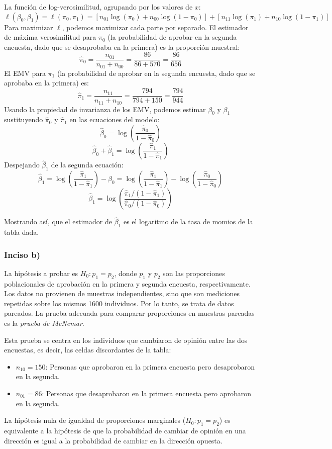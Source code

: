 \documentclass[paper=letter, fontsize=11pt, draft=false]{scrartcl}\usepackage[]{graphicx}\usepackage[]{xcolor}
\numberwithin{equation}{problemcounter} %
\numberwithin{figure}{problemcounter} %
\numberwithin{table}{problemcounter} %
\numberwithin{subsection}{problemcounter}
\begin{document}
La función de log-verosimilitud, agrupando por los valores de $x$:
\[
\ell(\beta_0, \beta_1) = \ell(\pi_0, \pi_1) = [n_{01}\log(\pi_0) + n_{00}\log(1-\pi_0)] + [n_{11}\log(\pi_1) + n_{10}\log(1-\pi_1)]
\]
Para maximizar $\ell$, podemos maximizar cada parte por separado.
El estimador de máxima verosimilitud para $\pi_0$ (la probabilidad de aprobar en la segunda encuesta, dado que se desaprobaba en la primera) es la proporción muestral:
\[
\hat{\pi}_0 = \frac{n_{01}}{n_{01}+n_{00}} = \frac{86}{86+570} = \frac{86}{656}
\]
El EMV para $\pi_1$ (la probabilidad de aprobar en la segunda encuesta, dado que se aprobaba en la primera) es:
\[
\hat{\pi}_1 = \frac{n_{11}}{n_{11}+n_{10}} = \frac{794}{794+150} = \frac{794}{944}
\]
Usando la propiedad de invarianza de los EMV, podemos estimar $\beta_0$ y $\beta_1$ sustituyendo $\hat{\pi}_0$ y $\hat{\pi}_1$ en las ecuaciones del modelo:
\[
\hat{\beta}_0 = \log\left(\frac{\hat{\pi}_0}{1-\hat{\pi}_0}\right)
\]
\[
\hat{\beta}_0 + \hat{\beta}_1 = \log\left(\frac{\hat{\pi}_1}{1-\hat{\pi}_1}\right)
\]
Despejando $\hat{\beta}_1$ de la segunda ecuación:
\[
\hat{\beta}_1 = \log\left(\frac{\hat{\pi}_1}{1-\hat{\pi}_1}\right) - \hat{\beta}_0 = \log\left(\frac{\hat{\pi}_1}{1-\hat{\pi}_1}\right) - \log\left(\frac{\hat{\pi}_0}{1-\hat{\pi}_0}\right)
\]
\[
\hat{\beta}_1 = \log\left( \frac{\hat{\pi}_1/(1-\hat{\pi}_1)}{\hat{\pi}_0/(1-\hat{\pi}_0)} \right)
\]

Mostrando así, que el estimador de $\hat{\beta}_1$ es el logaritmo de la tasa de momios de la tabla dada.

\subsubsection*{Inciso b)}

La hipótesis a probar es $H_0: p_1 = p_2$, donde $p_1$ y $p_2$ son las proporciones poblacionales de aprobación en la primera y segunda encuesta, respectivamente.
Los datos no provienen de muestras independientes, sino que son mediciones repetidas sobre los mismos 1600 individuos. Por lo tanto, se trata de datos pareados. La prueba adecuada para comparar proporciones en muestras pareadas es la \textit{prueba de McNemar}.

Esta prueba se centra en los individuos que cambiaron de opinión entre las dos encuestas, es decir, las celdas discordantes de la tabla:
\begin{itemize}
    \item $n_{10} = 150$: Personas que aprobaron en la primera encuesta pero desaprobaron en la segunda.
    \item $n_{01} = 86$: Personas que desaprobaron en la primera encuesta pero aprobaron en la segunda.
\end{itemize}
La hipótesis nula de igualdad de proporciones marginales ($H_0: p_1 = p_2$) es equivalente a la hipótesis de que la probabilidad de cambiar de opinión en una dirección es igual a la probabilidad de cambiar en la dirección opuesta.
\end{document}
